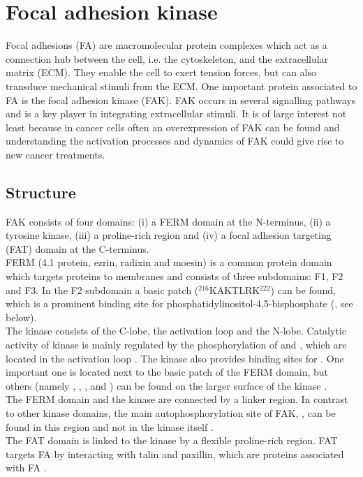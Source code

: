 \section{Focal adhesion kinase}
Focal adhesions (FA) are macromolecular protein complexes which act as a connection hub between the cell, i.e. the cytoskeleton, and the extracellular matrix (ECM). They enable the cell to exert tension forces, but can also transduce mechanical stimuli from the ECM. One important protein associated to FA is the focal adhesion kinase (FAK). FAK occurs in several signalling pathways and is a key player in integrating extracellular stimuli. It is of large interest not least because in cancer cells often an overexpression of FAK can be found and understanding the activation processes and dynamics of FAK could give rise to new cancer treatments.%
\subsection{Structure}
FAK consists of four domains: (i) a FERM domain at the N-terminus, (ii) a tyrosine kinase, (iii) a proline-rich region and (iv) a focal adhesion targeting (FAT) domain at the C-terminus.\\
FERM (4.1 protein, ezrin, radixin and moesin) is a common protein domain which targets proteins to membranes \autocite{fermdomain} and consists of three subdomains: F1, F2 and F3. In the F2 subdomain a basic patch ($^{216}$KAKTLRK$^{222}$) can be found, which is a prominent binding site for phosphatidylinositol-4,5-bisphosphate (\pip, see below).\\
The kinase consists of the C-lobe, the activation loop and the N-lobe. Catalytic activity of kinase is mainly regulated by the phosphorylation of  and , which are located in the activation loop \autocite{tyrosinePhosphor}. The kinase also provides binding sites for \pip{}. One important one is located next to the basic patch of the FERM domain, but others (namely , , ,  and ) can be found on the larger surface of the kinase \autocites{pap002}{pap002Exp}.\\
The FERM domain and the kinase are connected by a linker region. In contrast to other kinase domains, the main autophosphorylation site of FAK, , can be found in this region and not in the kinase itself \autocite{pap001}.\\ %
The FAT domain is linked to the kinase by a flexible proline-rich region. FAT targets FA by interacting with talin and paxillin, which are proteins associated with FA \autocite{fatdomain}.
